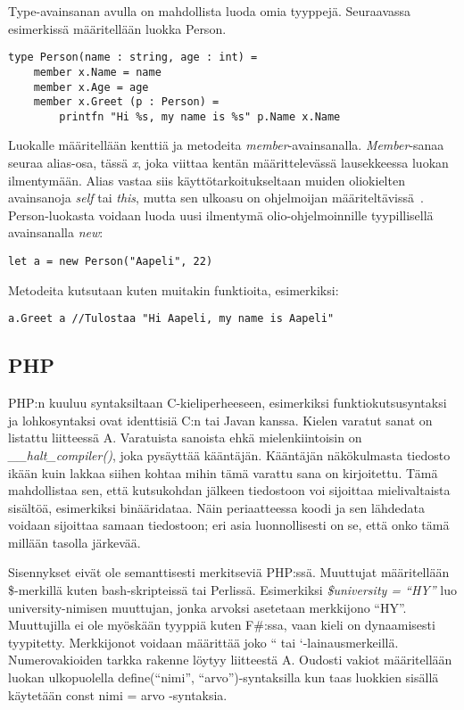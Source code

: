 Type-avainsanan avulla on mahdollista luoda omia tyyppejä. Seuraavassa esimerkissä määritellään luokka Person.

\lstset{
	language=FSharp,
	basicstyle=\ttfamily,
	breaklines=true,
	columns=fullflexible
}

\begin{lstlisting}
type Person(name : string, age : int) =
	member x.Name = name
	member x.Age = age
	member x.Greet (p : Person) = 
		printfn "Hi %s, my name is %s" p.Name x.Name    
\end{lstlisting}

Luokalle määritellään kenttiä ja metodeita \textit{member}-avainsanalla. \textit{Member}-sanaa seuraa alias-osa, tässä \textit{x}, joka viittaa kentän määrittelevässä lausekkeessa luokan ilmentymään. Alias vastaa siis käyttötarkoitukseltaan muiden oliokielten avainsanoja \textit{self} tai \textit{this}, mutta sen ulkoasu on ohjelmoijan määriteltävissä~\cite{wiki_fs_programming}. 
Person-luokasta voidaan luoda uusi ilmentymä olio-ohjelmoinnille tyypillisellä avainsanalla \textit{new}:

\begin{lstlisting}
let a = new Person("Aapeli", 22)
\end{lstlisting}

Metodeita kutsutaan kuten muitakin funktioita, esimerkiksi:

\begin{lstlisting}
a.Greet a //Tulostaa "Hi Aapeli, my name is Aapeli"
\end{lstlisting}

\subsection{PHP}
PHP:n kuuluu syntaksiltaan C-kieliperheeseen, esimerkiksi funktiokutsusyntaksi ja lohkosyntaksi ovat identtisiä C:n tai Javan kanssa. Kielen varatut sanat on listattu liitteessä A. Varatuista sanoista ehkä mielenkiintoisin on \textit{\_\_halt\_compiler()}, joka pysäyttää kääntäjän. Kääntäjän näkökulmasta tiedosto ikään kuin lakkaa siihen kohtaa mihin tämä varattu sana on kirjoitettu. Tämä mahdollistaa sen, että kutsukohdan jälkeen tiedostoon voi sijoittaa mielivaltaista sisältöä, esimerkiksi binääridataa. Näin periaatteessa koodi ja sen lähdedata voidaan sijoittaa samaan tiedostoon; eri asia luonnollisesti on se, että onko tämä millään tasolla järkevää.

Sisennykset eivät ole semanttisesti merkitseviä PHP:ssä. Muuttujat  määritellään \$-merkillä kuten bash-skripteissä tai Perlissä. Esimerkiksi \textit{\$university  = “HY”} luo university-nimisen muuttujan, jonka arvoksi asetetaan merkkijono “HY”. Muuttujilla ei ole myöskään tyyppiä kuten F\#:ssa, vaan kieli on dynaamisesti tyypitetty. Merkkijonot voidaan määrittää joko “ tai ‘-lainausmerkeillä. Numerovakioiden tarkka rakenne löytyy liitteestä A. Oudosti vakiot määritellään luokan ulkopuolella define(“nimi”, “arvo”)-syntaksilla kun taas luokkien sisällä käytetään const nimi = arvo -syntaksia.

